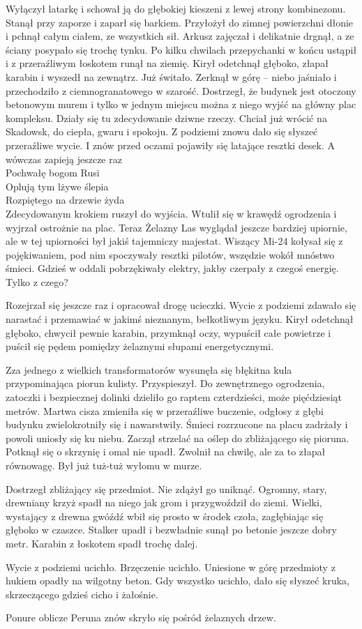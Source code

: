 \documentclass[../MAIN.tex]{subfiles}
\begin{document}
Wyłączył latarkę i schował ją do głębokiej kieszeni z lewej strony kombinezonu. Stanął przy zaporze i zaparł się barkiem. Przyłożył do zimnej powierzchni dłonie i pchnął całym ciałem, ze wszystkich sił. Arkusz zajęczał i delikatnie drgnął, a ze ściany posypało się trochę tynku. Po kilku chwilach przepychanki w końcu ustąpił i z przeraźliwym łoskotem runął na ziemię. Kirył odetchnął głęboko, złapał karabin i wyszedł na zewnątrz. Już świtało. Zerknął w górę – niebo jaśniało i przechodziło z ciemnogranatowego w szarość. Dostrzegł, że budynek jest otoczony betonowym murem i tylko w jednym miejscu można z niego wyjść na główny plac kompleksu. Działy się tu zdecydowanie dziwne rzeczy. Chciał już wrócić na Skadowsk, do ciepła, gwaru i spokoju. Z podziemi znowu dało się słyszeć przeraźliwe wycie. I znów przed oczami pojawiły się latające resztki desek.
\sw
A wówczas zapieją jeszcze raz\\
Pochwałę bogom Rusi\\
Oplują tym lżywe ślepia\\
Rozpiętego na drzewie żyda\\
\qw
Zdecydowanym krokiem ruszył do wyjścia. Wtulił się w krawędź ogrodzenia i wyjrzał ostrożnie na plac. Teraz Żelazny Las wyglądał jeszcze bardziej upiornie, ale w tej upiorności był jakiś tajemniczy majestat. Wiszący Mi-24 kołysał się z pojękiwaniem, pod nim spoczywały resztki pilotów, wszędzie wokół mnóstwo śmieci. Gdzieś w oddali pobrzękiwały elektry, jakby czerpały z czegoś energię. Tylko z czego?

Rozejrzał się jeszcze raz i opracował drogę ucieczki. Wycie z podziemi zdawało się narastać i przemawiać w jakimś nieznanym, bełkotliwym języku. Kirył odetchnął głęboko, chwycił pewnie karabin, przymknął oczy, wypuścił całe powietrze i puścił się pędem pomiędzy żelaznymi słupami energetycznymi.

Zza jednego z wielkich transformatorów wysunęła się błękitna kula przypominająca piorun kulisty. Przyspieszył. Do zewnętrznego ogrodzenia, zatoczki i bezpiecznej dolinki dzieliło go raptem czterdzieści, może pięćdziesiąt metrów. Martwa cisza zmieniła się w przeraźliwe buczenie, odgłosy z głębi budynku zwielokrotniły się i nawarstwiły. Śmieci rozrzucone na placu zadrżały i powoli uniosły się ku niebu. Zaczął strzelać na oślep do zbliżającego się pioruna. Potknął się o skrzynię i omal nie upadł. Zwolnił na chwilę, ale za to złapał równowagę. Był już tuż-tuż wyłomu w murze.

Dostrzegł zbliżający się przedmiot. Nie zdążył go uniknąć. Ogromny, stary, drewniany krzyż spadł na niego jak grom i przygwoździł do ziemi. Wielki, wystający z drewna gwóźdź wbił się prosto w środek czoła, zagłębiając się głęboko w czaszce. Stalker upadł i bezwładnie sunął po betonie jeszcze dobry metr. Karabin z łoskotem spadł trochę dalej.

Wycie z podziemi ucichło. Brzęczenie ucichło. Uniesione w górę przedmioty z hukiem opadły na wilgotny beton. Gdy wszystko ucichło, dało się słyszeć kruka, skrzeczącego gdzieś cicho i żałośnie.

Ponure oblicze Peruna znów skryło się pośród żelaznych drzew.
\end{document}

